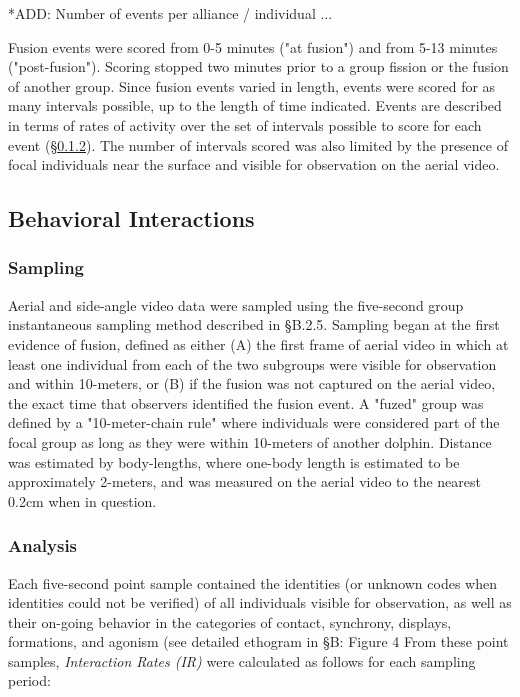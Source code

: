 \documentclass[11pt]{amsart}
\begin{document}
\vspace{3mm} *ADD: Number of events per alliance / individual ... \vspace{3mm} %

Fusion events were scored from 0-5 minutes ("at fusion") and from 5-13 minutes ("post-fusion"). Scoring stopped two minutes prior to a group fission or the fusion of another group. Since fusion events varied in length, events were scored for as many intervals possible, up to the length of time indicated. Events are described in terms of rates of activity over the set of intervals possible to score for each event (\S\ref{sec:analysis}). The number of intervals scored was also limited by the presence of focal individuals near the surface and visible for observation on the aerial video.

\subsection{Behavioral Interactions}
\subsubsection{Sampling}
Aerial and side-angle video data were sampled using the five-second group instantaneous sampling method described in \S{B.2.5}. Sampling began at the first evidence of fusion, defined as either (A) the first frame of aerial video in which at least one individual from each of the two subgroups were visible for observation and within 10-meters, or (B) if the fusion was not captured on the aerial video, the exact time that observers identified the fusion event. A "fuzed" group was defined by a "10-meter-chain rule" \citep{smolker:1992} where individuals were considered part of the focal group as long as they were within 10-meters of another dolphin. Distance was estimated by body-lengths, where one-body length is estimated to be approximately 2-meters, and was measured on the aerial video to the nearest 0.2cm when in question.


\subsubsection{Analysis}\label{sec:analysis}
Each five-second point sample contained the identities (or unknown codes when identities could not be verified) of all individuals visible for observation, as well as their on-going behavior in the categories of contact, synchrony, displays, formations, and agonism (see detailed ethogram in \S{B: Figure 4} %
From these point samples, \emph{Interaction Rates (IR)} were calculated as follows for each sampling period: 
\end{document}
